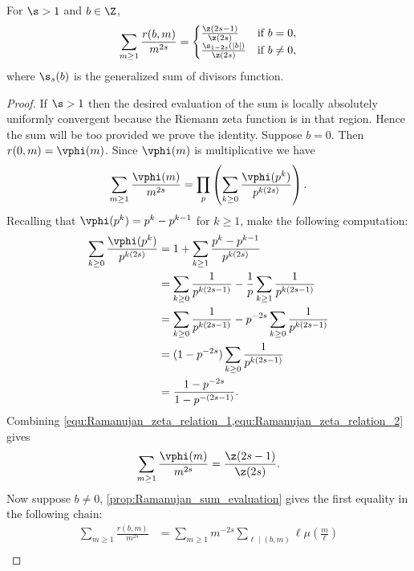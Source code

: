       \begin{lemma}\label{lem:Ramanujan_zeta_relation}
        For $\s > 1$ and $b \in \Z$,
        \[
          \sum_{m \ge 1}\frac{r(b,m)}{m^{2s}} = \begin{cases} \frac{\z(2s-1)}{\z(2s)} & \text{if $b = 0$}, \\ \frac{\s_{1-2s}(|b|)}{\z(2s)} & \text{if $b \neq 0$}, \end{cases}
        \]
        where $\s_{s}(b)$ is the generalized sum of divisors function.
      \end{lemma}
      \begin{proof}
        If $\s > 1$ then the desired evaluation of the sum is locally absolutely uniformly convergent because the Riemann zeta function is in that region. Hence the sum will be too provided we prove the identity. Suppose $b = 0$. Then $r(0,m) = \vphi(m)$. Since $\vphi(m)$ is multiplicative we have
        \begin{equation}\label{equ:Ramanujan_zeta_relation_1}
          \sum_{m \ge 1}\frac{\vphi(m)}{m^{2s}} = \prod_{p}\left(\sum_{k \ge 0}\frac{\vphi(p^{k})}{p^{k(2s)}}\right).
        \end{equation}
        Recalling that $\vphi(p^{k}) = p^{k}-p^{k-1}$ for $k \ge 1$, make the following computation:
        \begin{equation}\label{equ:Ramanujan_zeta_relation_2}
          \begin{aligned}
            \sum_{k \ge 0}\frac{\vphi(p^{k})}{p^{k(2s)}} &= 1+\sum_{k \ge 1}\frac{p^{k}-p^{k-1}}{p^{k(2s)}} \\
            &= \sum_{k \ge 0}\frac{1}{p^{k(2s-1)}}-\frac{1}{p}\sum_{k \ge 1}\frac{1}{p^{k(2s-1)}} \\
            &= \sum_{k \ge 0}\frac{1}{p^{k(2s-1)}}-p^{-2s}\sum_{k \ge 0}\frac{1}{p^{k(2s-1)}} \\
            &= (1-p^{-2s})\sum_{k \ge 0}\frac{1}{p^{k(2s-1)}} \\
            &= \frac{1-p^{-2s}}{1-p^{-(2s-1)}}.
          \end{aligned}
        \end{equation}
        Combining \cref{equ:Ramanujan_zeta_relation_1,equ:Ramanujan_zeta_relation_2} gives
        \[
          \sum_{m \ge 1}\frac{\vphi(m)}{m^{2s}} = \frac{\z(2s-1)}{\z(2s)}.
        \]
        Now suppose $b \neq 0$, \cref{prop:Ramanujan_sum_evaluation} gives the first equality in the following chain:
        \begin{align*}
          \sum_{m \ge 1}\frac{r(b,m)}{m^{2s}} &= \sum_{m \ge 1}m^{-2s}\sum_{\ell \mid (b,m)}\ell\mu\left(\frac{m}{\ell}\right) \\

\end{align*}
\end{proof}
